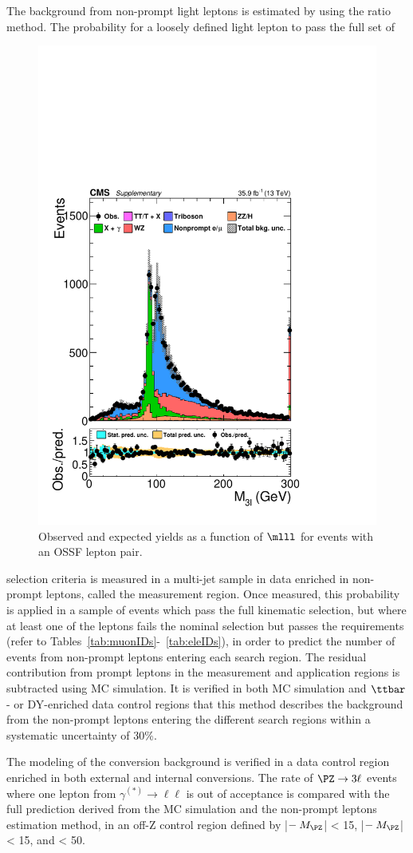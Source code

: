 The background from non-prompt light leptons is estimated by using the \ttol ratio method. 
The probability for a loosely defined light lepton to pass the full
set of
 \begin{figure}
\centering
    \includegraphics[width=.38\textwidth]{Figures/c5/distribution/SR/M3l_baseline_3lOSSF_noSignal_lin.pdf}
\caption{Observed and expected yields as a function of $\mlll$
for events with an OSSF lepton pair. \willem}
\label{fig:willem3L}
\end{figure}
 selection criteria is measured in a multi-jet sample in data enriched in non-prompt leptons, called the measurement region. 
Once measured, this probability is applied in a sample of events which
pass the full kinematic selection, but where at least one of the
leptons fails the nominal selection but passes the \lo requirements
(refer to Tables~\ref{tab:muonIDs}-~\ref{tab:eleIDs}), 
in order to predict the number of events from non-prompt leptons entering each search region. 
The residual contribution from prompt leptons in the measurement and application regions is subtracted using MC simulation. 
It is verified in both MC simulation and $\ttbar$- or DY-enriched data control regions that this method describes the background from the non-prompt leptons entering the different search regions within 
a systematic uncertainty of 30\%. 
 
The modeling of the conversion background is verified in a data control region enriched in both external and internal conversions. 
The rate of $\PZ \to 3\ell$ events where one lepton from $\gamma^{(*)}\to\ell\ell$ is out of acceptance is compared with 
the full prediction derived from the MC simulation and the non-prompt leptons estimation method, in an off-Z control region 
defined by |\Mll $- \:M_\PZ$| < 15\GeV, |\mlll $- \:M_\PZ$| < 15\GeV,
and \ptmiss < 50\GeV. 

